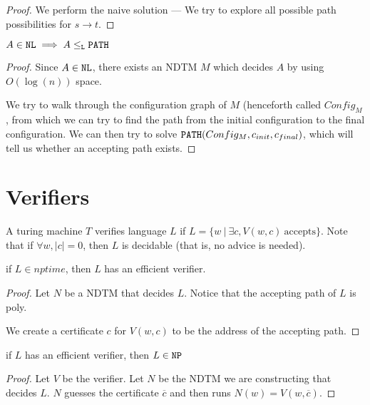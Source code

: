 \begin{proof}
We perform the naive solution --- We try to explore all possible path possibilities for $s \to t$.
\end{proof}

\begin{theorem}
    $A \in \texttt{NL} \implies A \leq_{\texttt{L}} \texttt{PATH}$
\end{theorem}
\begin{proof}
    Since $A \in \texttt{NL}$, there exists an NDTM $M$ which decides $A$ by
    using $O(\log(n))$ space.


    We try to walk through the configuration graph of $M$ (henceforth called $Config_M$, from which
    we can try to find the path from the initial configuration to the
    final configuration. We can then try to solve
    $\texttt{PATH}(Config_M, c_{init}, c_{final})$, which will tell us
    whether an accepting path exists.
\end{proof}

\section{Verifiers}
A turing machine $T$ verifies language $L$ if $L = \{ w~\vert~ \exists c, V(w, c)~\text{accepts} \}$.
Note that if $\forall w, |c| = 0$, then $L$ is decidable (that is, no advice is needed).

\begin{theorem}
    if $L \in nptime$, then $L$ has an efficient verifier.
\end{theorem}
\begin{proof}
    Let $N$ be a NDTM that decides $L$. Notice that the accepting path of $L$
    is poly.

    We create a certificate $c$ for $V(w, c)$ to be the address of the
    accepting path. 
\end{proof}

\begin{theorem}
    if $L$ has an efficient verifier, then $L \in \texttt{NP}$
\end{theorem}
\begin{proof}
    Let $V$ be the verifier.
    Let $N$ be the NDTM we are constructing that decides $L$. 
    $N$ guesses the certificate $\overline{c}$ and then runs $N(w) = V(w, \overline{c})$.
\end{proof}


\section{\conptime}

